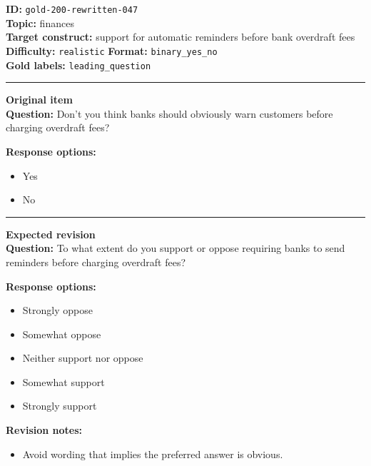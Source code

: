 \documentclass[10pt,a4paper]{article}
\newcommand{\sectionline}{\vspace{0.15em}\hrule\vspace{0.35em}}
\begin{document}
\begin{tcolorbox}[colframe=FlawRed,colback=white,colbacktitle=FlawRed!9,coltitle=black,title={Item 047\hfill Flawed item}]
\textbf{ID:} \texttt{gold-200-rewritten-047}\\
\textbf{Topic:} finances\\
\textbf{Target construct:} support for automatic reminders before bank overdraft fees\\
\textbf{Difficulty:} \texttt{realistic} \quad \textbf{Format:} \texttt{binary\_yes\_no}\\
\textbf{Gold labels:} \texttt{leading\_question}\\
\sectionline
\textbf{Original item}\\
\textbf{Question:} Don't you think banks should obviously warn customers before charging overdraft fees?
\par\textbf{Response options:}
\begin{itemize}
\item Yes
\item No
\end{itemize}
\sectionline
\textbf{Expected revision}\\
\textbf{Question:} To what extent do you support or oppose requiring banks to send reminders before charging overdraft fees?
\par\textbf{Response options:}
\begin{itemize}
\item Strongly oppose
\item Somewhat oppose
\item Neither support nor oppose
\item Somewhat support
\item Strongly support
\end{itemize}
\par\textbf{Revision notes:}
\begin{itemize}
\item Avoid wording that implies the preferred answer is obvious.
\end{itemize}
\end{tcolorbox}
\end{document}
